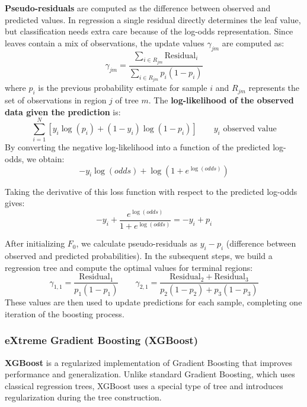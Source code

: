 \textbf{Pseudo-residuals} are computed as the difference between observed and predicted values. In regression a single residual directly determines the leaf value, but classification needs extra care because of the log-odds representation. Since leaves contain a mix of observations, the update values $\gamma_{jm}$ are computed as:
\begin{equation}
    \gamma_{jm} = \frac{\sum_{i \in R_{jm}} \text{Residual}_i}{\sum_{i \in R_{jm}} p_i (1 - p_i)}
\end{equation}
where $p_i$ is the previous probability estimate for sample $i$ and $R_{jm}$ represents the set of observations in region $j$ of tree $m$. The \textbf{log-likelihood of the observed data given the prediction} is:
\begin{equation}
    \sum_{i=1}^N \left[ y_i \log(p_i) + (1-y_i)\log(1-p_i) \right]  \qquad y_i \text{ observed value}
\end{equation}
By converting the negative log-likelihood into a function of the predicted log-odds, we obtain:
\begin{equation}
    -y_i \log(odds) + \log(1+e^{\log(odds)})
\end{equation}

Taking the derivative of this loss function with respect to the predicted log-odds gives:
\begin{equation}
    -y_i + \frac{e^{\log(odds)}}{1+e^{\log(odds)}} = -y_i + p_i
\end{equation}

After initializing $F_0$, we calculate pseudo-residuals as $y_i - p_i$ (difference between observed and predicted probabilities). In the subsequent steps, we build a regression tree and compute the optimal values for terminal regions:
\begin{equation}
    \gamma_{1,1} = \frac{\text{Residual}_1}{p_1 (1-p_1)} \qquad
    \gamma_{2,1} = \frac{\text{Residual}_2 + \text{Residual}_3}{p_2(1-p_2) + p_3(1-p_3)}    
\end{equation}
These values are then used to update predictions for each sample, completing one iteration of the boosting process.
\subsubsection{eXtreme Gradient Boosting (XGBoost)}

\textbf{XGBoost} is a regularized implementation of Gradient Boosting that improves performance and generalization. Unlike standard Gradient Boosting, which uses classical regression trees, XGBoost uses a special type of tree and introduces regularization during the tree construction.

